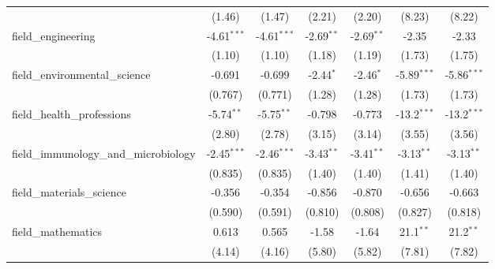 \begin{tabular}{lcccccc}
                                                               & (1.46)         & (1.47)         & (2.21)         & (2.20)         & (8.23)         & (8.22)\\   
   field\_engineering                                          & -4.61$^{***}$  & -4.61$^{***}$  & -2.69$^{**}$   & -2.69$^{**}$   & -2.35          & -2.33\\   
                                                               & (1.10)         & (1.10)         & (1.18)         & (1.19)         & (1.73)         & (1.75)\\   
   field\_environmental\_science                               & -0.691         & -0.699         & -2.44$^{*}$    & -2.46$^{*}$    & -5.89$^{***}$  & -5.86$^{***}$\\   
                                                               & (0.767)        & (0.771)        & (1.28)         & (1.28)         & (1.73)         & (1.73)\\   
   field\_health\_professions                                  & -5.74$^{**}$   & -5.75$^{**}$   & -0.798         & -0.773         & -13.2$^{***}$  & -13.2$^{***}$\\   
                                                               & (2.80)         & (2.78)         & (3.15)         & (3.14)         & (3.55)         & (3.56)\\   
   field\_immunology\_and\_microbiology                        & -2.45$^{***}$  & -2.46$^{***}$  & -3.43$^{**}$   & -3.41$^{**}$   & -3.13$^{**}$   & -3.13$^{**}$\\   
                                                               & (0.835)        & (0.835)        & (1.40)         & (1.40)         & (1.41)         & (1.40)\\   
   field\_materials\_science                                   & -0.356         & -0.354         & -0.856         & -0.870         & -0.656         & -0.663\\   
                                                               & (0.590)        & (0.591)        & (0.810)        & (0.808)        & (0.827)        & (0.818)\\   
   field\_mathematics                                          & 0.613          & 0.565          & -1.58          & -1.64          & 21.1$^{**}$    & 21.2$^{**}$\\   
                                                               & (4.14)         & (4.16)         & (5.80)         & (5.82)         & (7.81)         & (7.82)\\   

\end{tabular}
